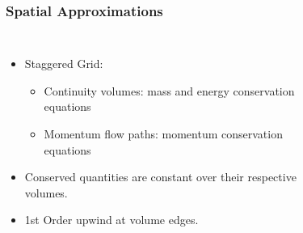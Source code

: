 \documentclass[compress,xcolor=table]{beamer}
\newlength{\hpw}
\begin{document}
\begin{frame}
\frametitle{Spatial Approximations}

\begin{columns}
\column{\hpw}

\begin{itemize}
\item{Staggered Grid:
\begin{itemize}
\item{Continuity volumes: mass and energy conservation equations}
\item{Momentum flow paths: momentum conservation equations}
\end{itemize}
}
\item{Conserved quantities are constant over their respective volumes.}
\item{1st Order upwind at volume edges.}
\end{itemize}


\column{\hpw}
\begin{figure}
\centering
\resizebox{\textwidth}{!}{

}
\end{figure}
\end{columns}

\end{frame}
\end{document}

